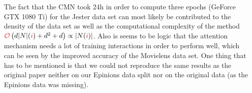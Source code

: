 The fact that the CMN took 24h in order to compute three epochs (GeForce GTX 1080 Ti) for the Jester data set can most likely be contributed to the density of the data set as well as the computational complexity of the method $\bigO\left(d\abs{N}(\idxi)+d^2+d\right)\propto\abs{N(\idxi)}$.
Also is seems to be logic that the attention mechanism needs a lot of training interactions in order to perform well, which can be seen by the improved accuracy of the Movielens data set.
One thing that has to be mentioned is that we could not reproduce the same results as the original paper neither on our Epinions data split nor on the original data (as the Epinions data was missing).